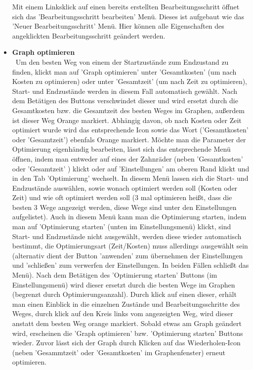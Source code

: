 \documentclass[twoside]{report}
\begin{document}
\begin{itemize}
Mit einem Linksklick auf einen bereits erstellten Bearbeitungsschritt öffnet sich das 'Bearbeitungsschritt bearbeiten' Menü. Dieses ist aufgebaut wie das 'Neuer Bearbeitungsschritt' Menü. Hier können alle Eigenschaften des angeklickten Bearbeitungsschritt geändert werden.
  \item \textbf{ Graph optimieren }
    \\\
      Um den besten Weg von einem der Startzustände zum Endzustand zu finden, klickt man auf 'Graph optimieren' unter 'Gesamtkosten' (um nach Kosten zu optimieren) oder unter 'Gesamtzeit' (um nach Zeit zu optimieren), Start- und Endzustände werden in diesem Fall automatisch gewählt. Nach dem Betätigen des Buttons verschwindet dieser und wird ersetzt durch die Gesamtkosten bzw. die Gesamtzeit des besten Weges im Graphen, außerdem ist dieser Weg Orange markiert. Abhängig davon, ob nach Kosten oder Zeit optimiert wurde wird das entsprechende Icon sowie das Wort ('Gesamtkosten' oder 'Gesamtzeit') ebenfals Orange markiert.
Möchte man die Parameter der Optimierung eigenhändig bearbeiten, lässt sich das entsprechende Menü öffnen, indem man entweder auf eines der Zahnräder (neben 'Gesamtkosten' oder 'Gesamtzeit' ) klickt oder auf 'Einstellungen' am oberen Rand klickt und in den Tab 'Optimierung' wechselt. In diesem Menü lassen sich die Start- und Endzustände auswählen, sowie wonach optimiert werden soll (Kosten oder Zeit) und wie oft optimiert werden soll (3 mal optimieren heißt, dass die besten 3 Wege angezeigt werden, diese Wege sind unter den Einstellungen aufgelistet). Auch in diesem Menü kann man die Optimierung starten, indem man auf 'Optimierung starten' (unten im Einstellungsmenü) klickt, sind Start- und Endzustände nicht ausgewählt, werden diese wieder automatisch bestimmt, die Optimierungsart (Zeit/Kosten) muss allerdings ausgewählt sein (alternativ dient der Button 'anwenden' zum übernehmen der Einstellungen und 'schließen' zum verwerfen der Einstellungen. In beiden Fällen schließt das Menü).
Nach dem Betätigen des 'Optimierung starten' Buttons (im Einstellungsmenü) wird dieser ersetzt durch die besten Wege im Graphen (begrenzt durch Optimierungsanzahl). Durch klick auf einen dieser, erhält man einen Einblick in die einzelnen Zustände und Bearbeitungsschritte des Weges, durch klick auf den Kreis links vom angezeigten Weg, wird dieser anstatt dem besten Weg orange markiert.
Sobald etwas am Graph geändert wird, erscheinen die 'Graph optimieren' bzw. 'Optimierung starten' Buttons wieder. Zuvor lässt sich der Graph durch Klicken auf das Wiederholen-Icon (neben 'Gesammtzeit' oder 'Gesamtkosten' im Graphenfenster) erneut optimieren.

\end{itemize}
\end{document}
